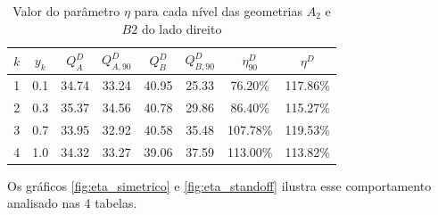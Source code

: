     \begin{table}[H]
        \centering
        \caption{Valor do parâmetro $\eta$ para cada nível das geometrias $A_2$ e $B2$ do lado direito}
    	\begin{tabular}{cccccccc}
    		\hline
    		$k$ & $y_k$ & $Q_A^D$ & $Q_{A,90}^D$ & $Q_B^D$ & $Q_{B,90}^D$ & $\eta_{90}^D$ & $\eta^D$ \\
    		\hline
    		1 & 0.1 & 34.74 & 33.24 & 40.95 & 25.33 & 76.20\% & 117.86\% \\
    		2 & 0.3 & 35.37 & 34.56 & 40.78 & 29.86 & 86.40\% & 115.27\% \\
    		3 & 0.7 & 33.95 & 32.92 & 40.58 & 35.48 & 107.78\% & 119.53\% \\
    		4 & 1.0 & 34.32 & 33.27 & 39.06 & 37.59 & 113.00\% & 113.82\% \\
    		\hline
    	\end{tabular}
    	\label{tab:tabela_resultado_geralA2B2D}
    \end{table}
    
Os gráficos \ref{fig:eta_simetrico} e \ref{fig:eta_standoff} ilustra esse comportamento analisado nas 4 tabelas.
    
